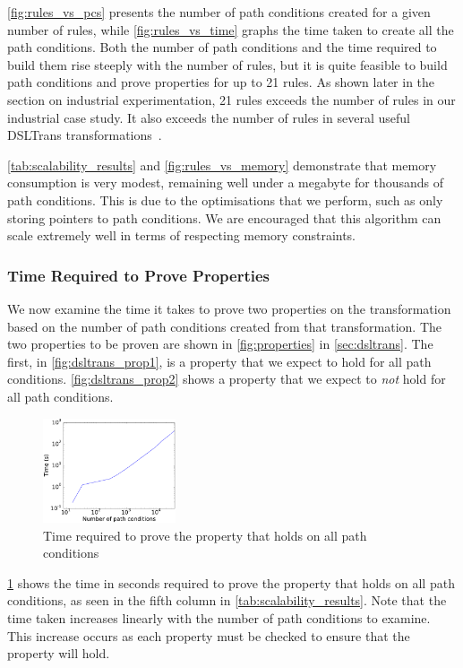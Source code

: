 \cref{fig:rules_vs_pcs} presents the number of path conditions created for
a given number of rules, while \cref{fig:rules_vs_time} graphs the time
taken to create all the path conditions. Both the number of path conditions and
the time required to build them rise steeply with the number of rules, but it
is quite feasible to build path conditions and prove properties for up to 21
rules. As shown later in the section on industrial experimentation, 21 rules
exceeds the number of rules in our industrial case study. It also exceeds the
number of rules in several useful DSLTrans
transformations~\cite{febavava:10,dsltrans_manual,zhang:ACP_APN:11}.

\cref{tab:scalability_results} and \cref{fig:rules_vs_memory} demonstrate that memory consumption is very modest, remaining well under a megabyte for thousands of path conditions. This is due to the optimisations that we perform, such as only storing pointers to path conditions. We are encouraged that this algorithm can scale extremely well in terms of respecting memory constraints.


\subsubsection{Time Required to Prove Properties}

We now examine the time it takes to prove two properties on the transformation based on the number of path conditions created from that transformation. The two properties to be proven are shown in \cref{fig:properties} in \cref{sec:dsltrans}. The first, in \cref{fig:dsltrans_prop1}, is a property that we expect to hold for all path conditions. \cref{fig:dsltrans_prop2} shows a property that we expect to \emph{not} hold for all path conditions. 

\begin{figure}[bht] \centering \includegraphics[width=0.35\textwidth]{./figures/results/pcs_vs_prop1.pdf}
	\caption{Time required to prove the property that holds on all path conditions}
	\label{fig:pcs_vs_prop1}
\end{figure}

\cref{fig:pcs_vs_prop1} shows the time in seconds required to prove the property that holds on all path conditions, as seen in the fifth column in \cref{tab:scalability_results}. Note that the time taken increases linearly with the number of path conditions to examine. This increase occurs as each property must be checked to ensure that the property will hold.

